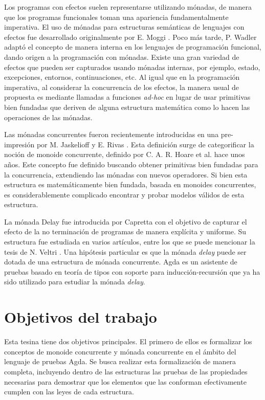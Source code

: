 Los programas con efectos suelen representarse utilizando
mónadas, de manera que los programas funcionales toman una apariencia
fundamentalmente imperativa. El uso de mónadas para estructuras semánticas de lenguajes con efectos fue desarrollado originalmente por E. Moggi \cite{moggi:1989, moggi:1991}. Poco más tarde, P. Wadler \cite{wadler:1992} adaptó el
concepto de manera interna en los lenguajes de programación funcional,
dando origen a la programación con mónadas. Existe una gran variedad
de efectos que pueden ser capturados usando mónadas internas, por
ejemplo, estado, excepciones, entornos, continuaciones, etc. Al igual que en la programación imperativa, al considerar la concurrencia de los efectos, la
manera usual de propuesta es mediante llamadas a funciones \textit{ad-hoc} en lugar de usar primitivas bien fundadas que deriven de alguna estructura
matemática como lo hacen las operaciones de las mónadas.

Las mónadas concurrentes fueron recientemente introducidas en una
pre-impresión por M. Jaskelioff y E. Rivas \cite{rivas:2019}. Esta
definición surge de categorificar la noción de monoide concurrente,
definido por C. A. R. Hoare et al. \cite{hoare:2011} hace unos
años. Este concepto fue definido buscando obtener primitivas bien fundadas para la concurrencia, extendiendo las mónadas con nuevos operadores. Si bien esta estructura es
matemáticamente bien fundada, basada en monoides concurrentes, es
considerablemente complicado encontrar y probar modelos válidos de
esta estructura. 

La mónada Delay fue introducida por Capretta \cite{capretta:2005} con el
objetivo de capturar el efecto de la no terminación de programas de manera explícita y
uniforme. Su estructura fue estudiada en varios artículos, entre los
que se puede mencionar la tesis de N. Veltri \cite{veltri:2017}. Una hipótesis particular es que la mónada \textit{delay} puede ser dotada de una estructura de mónada concurrente. Agda es un asistente de pruebas basado en teoría de tipos con soporte
para inducción-recursión que ya ha sido utilizado para estudiar la
mónada \textit{delay}.

\section{Objetivos del trabajo}

Esta tesina tiene dos objetivos principales. El primero de ellos es formalizar los conceptos de monoide concurrente y mónada concurrente en el ámbito del lenguaje de pruebas Agda. Se busca realizar esta formalización de manera completa, incluyendo dentro de las estructuras las pruebas de las propiedades necesarias para demostrar que los elementos que las conforman efectivamente cumplen con las leyes de cada estructura. 

